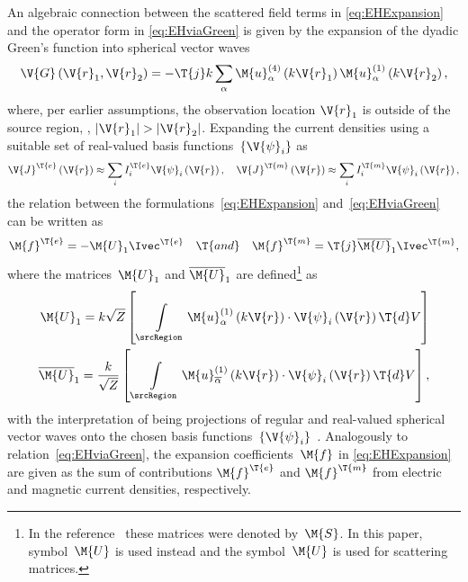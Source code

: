 \documentclass[journal]{IEEEtran}
\providecommand{\Je}{\V{J}^\T{e}} %
\providecommand{\Jm}{\V{J}^\T{m}} %
\providecommand{\Umat}{\M{U}} %
\providecommand{\Smat}{\M{U}} %
\providecommand{\Ie}{\Ivec^{\T{e}}} %
\renewcommand{\Im}{\Ivec^{\T{m}}} %
\providecommand{\fe}{\M{f}^{\T{e}}} %
\providecommand{\fm}{\M{f}^{\T{m}}} %
\begin{document}
An algebraic connection between the scattered field terms in \eqref{eq:EHExpansion} and the operator form in \eqref{eq:EHviaGreen} is given by the expansion of the dyadic Green's function into spherical vector waves~\cite{Stratton_ElectromagneticTheory,Hansen_SphericalNearFieldAntennaMeasurements, Kristensson_ScatteringBook}
\begin{equation}
    \label{eq:GreenExp}
    \V{G}\left(\V{r}_1,\V{r}_2\right)=-\T{j}k\sum_{\alpha}\M{u}_{\alpha}^{\left(4\right)}\left(k\V{r}_1\right)\M{u}_{\alpha}^{\left(1\right)}\left(k\V{r}_2\right),
\end{equation}
where, per earlier assumptions, the observation location $\V{r}_1$ is outside of the source region, \ie{}, $|\V{r}_1|>|\V{r}_2|$. 
Expanding the current densities using a suitable set of real-valued basis functions~$\{\V{\psi}_i\}$ as
\begin{equation}
    \label{eq:Jexp}
    \Je\left(\V{r}\right) \approx\sum_{i} I^\T{e}_i\V{\psi}_i\left(\V{r}\right) %
    ,\quad
    \Jm\left(\V{r}\right) \approx\sum_{i} I^\T{m}_i\V{\psi}_i\left(\V{r}\right),
\end{equation}
the relation between the formulations~\eqref{eq:EHExpansion} and~\eqref{eq:EHviaGreen} can be written as
\begin{equation}
\begin{aligned}
\label{eq:fFromIM}
\fe =  - \Umat_1 \Ie \quad \T{and} \quad \fm = \T{j} \overline{\Umat}_1 \Im,
\end{aligned}    
\end{equation}
where the matrices~$\Umat_1$ and $\overline{\Umat}_1$ are defined\footnote{In the reference~\cite{TayliEtAl_AccurateAndEfficientEvaluationofCMs} these matrices were denoted by~$\M{S}$. In this paper, symbol~$\Umat$ is used instead and the symbol~$\Smat$ is used for scattering matrices.} as
\begin{equation}
\begin{aligned}
    \label{eq:Smatrix}
    \Umat_1 = k\sqrt{Z} \left[ \, \int \limits_{\srcRegion} \M{u}_{\alpha}^{\left(1\right)} \left( k\V{r} \right) \cdot \V{\psi}_i \left( \V{r} \right) \T{d}V \right] \\
    \overline{\Umat}_1 = \dfrac{k}{\sqrt{Z}} \left[ \, \int \limits_{\srcRegion} \M{u}_{\overline{\alpha}}^{\left(1\right)} \left(k \V{r} \right) \cdot \V{\psi}_i \left( \V{r} \right) \T{d}V \right],
\end{aligned}
\end{equation}
with the interpretation of being projections of regular and real-valued spherical vector waves onto the chosen basis functions~$\{\V{\psi}_i\}$~\cite{TayliEtAl_AccurateAndEfficientEvaluationofCMs}. Analogously to relation~\eqref{eq:EHviaGreen}, the expansion coefficients~$\M{f}$ in \eqref{eq:EHExpansion} are given as the sum of contributions $\M{f}^\T{e}$ and $\M{f}^\T{m}$ from electric and magnetic current densities, respectively. 
\end{document}
